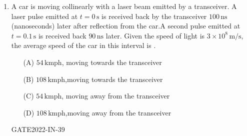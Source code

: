 \begin{enumerate}[label=\thechapter.\arabic*,ref=\thechapter.\theenumi]
\pagebreak
\item A car is moving collinearly with a laser beam emitted by a transceiver. A laser pulse emitted at $t = 0 \, \text{s}$ is received back by the transceiver $100 \, \text{ns}$ (nanoseconds) later after reflection from the car.A second pulse emitted at  $t = 0.1 \, \text{s}$  is received back  $90 \, \text{ns}$  later. Given the speed of light is $3 \times 10^8 \, \text{m/s}$, the average speed of the
car in this interval is \underline{\quad}.
\begin{enumerate}
    \item[(A)] $54\,\text{kmph}$, moving towards the transceiver
    \item[(B)] $108\,\text{kmph}$,moving towards the transceiver
    \item[(C)] $54\,\text{kmph}$, moving away from the transceiver
    \item[(D)] $108\,\text{kmph}$,moving away from the transceiver
\end{enumerate}
\hfill{GATE2022-IN-39}
\solution

\end{enumerate}
